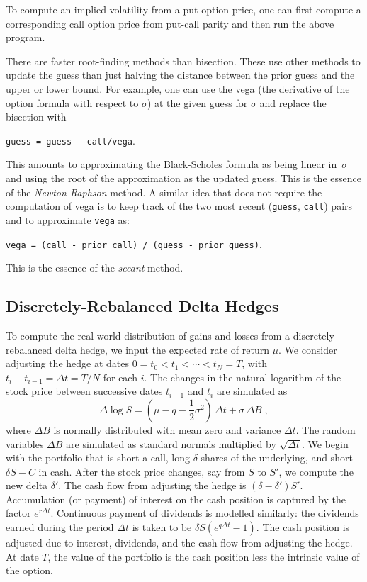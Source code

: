 To compute an implied volatility from a put option price, one can first compute a corresponding call option price from put-call parity and then run the above program.

There are faster root-finding methods than bisection.  These use other methods to update the guess than just halving the distance between the prior guess and the upper or lower bound.  For example, one can use the vega (the derivative of the option formula with respect to $\sigma$) at the given guess for $\sigma$ and replace the bisection with
\begin{center}
\verb!guess = guess - call/vega!\;.
\end{center}
This amounts to approximating the Black-Scholes formula as being linear in~$\sigma$ and using the root of the approximation as the updated guess.  This is the essence of the \emph{Newton-Raphson} method.   A similar idea that does not require the computation of vega is to keep track of the two most recent (\verb!guess!, \verb!call!) pairs and to approximate \verb!vega! as: 
\begin{center}
\verb!vega = (call - prior_call) / (guess - prior_guess)!\;.
 \end{center}
This is the essence of the \emph{secant} method. 

\subsection*{Discretely-Rebalanced Delta Hedges}
To compute the real-world distribution of gains and losses from a discretely-rebalanced delta hedge, we input the expected rate of return $\mu$.  We consider adjusting the hedge at dates $0=t_0<t_1<\cdots<t_N=T$, with $t_i-t_{i-1}=\varDelta t = T/N$ for each $i$.  The changes in the natural logarithm of the stock price between successive dates $t_{i-1}$ and $t_i$ are simulated as
$$\varDelta \log S = \left(\mu-q-\frac{1}{2}\sigma^2\right)\,\varDelta t + \sigma\,\varDelta B\; ,$$
where $\varDelta B$ is normally distributed with mean zero and variance $\varDelta t$.  The random variables $\varDelta B$ are simulated as standard normals multiplied by
$\sqrt{\varDelta t}$.  We begin with the portfolio that is short a call, long $\delta$ shares of the underlying, and short $\delta S-C$ in cash.  After the stock price changes, say from $S$ to $S'$, we compute the new delta $\delta'$.  The cash flow from adjusting the hedge is $(\delta-\delta')S'$.  Accumulation (or payment) of interest on the cash position is captured by the factor $e^{r\varDelta t}$.  Continuous payment of dividends is modelled similarly: the dividends earned during the period $\varDelta t$ is taken to be $\delta S\left(e^{q\varDelta t}-1\right)$.  The cash position is adjusted due to interest, dividends, and the cash flow from adjusting the hedge.  At date $T$, the value of the portfolio is the cash position less the intrinsic value of the option.

